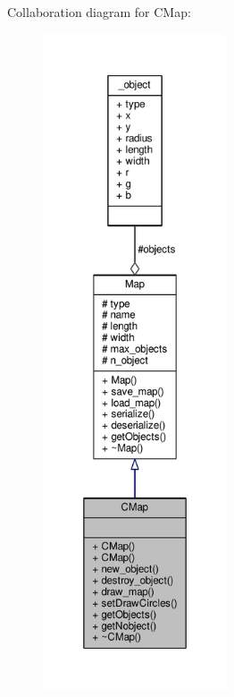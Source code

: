 Collaboration diagram for C\+Map\+:\nopagebreak
\begin{figure}[H]
\begin{center}
\leavevmode
\includegraphics[height=550pt]{class_c_map__coll__graph}
\end{center}
\end{figure}
